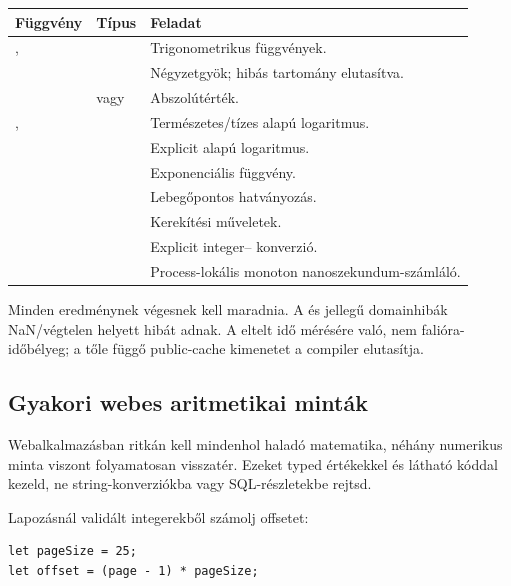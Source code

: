 \begin{center}
\begin{tabularx}{\textwidth}{@{}l l Y@{}}
\toprule
\textbf{Függvény} & \textbf{Típus} & \textbf{Feladat} \\
\midrule
{},  &  & Trigonometrikus függvények. \\
 &  & Négyzetgyök; hibás tartomány elutasítva. \\
 &  vagy  & Abszolútérték. \\
,  &  & Természetes/tízes alapú logaritmus. \\
 &  & Explicit alapú logaritmus. \\
 &  & Exponenciális függvény. \\
 &  & Lebegőpontos hatványozás. \\
 &  & Kerekítési műveletek. \\
 &  & Explicit integer-- konverzió. \\
 &  & Process-lokális monoton nanoszekundum-számláló. \\
\bottomrule
\end{tabularx}
\end{center}

Minden  eredménynek végesnek kell maradnia. A  és  jellegű domainhibák NaN/végtelen helyett hibát adnak. A  eltelt idő mérésére való, nem falióra-időbélyeg; a tőle függő public-cache kimenetet a compiler elutasítja.

\subsection*{Gyakori webes aritmetikai minták}

Webalkalmazásban ritkán kell mindenhol haladó matematika, néhány numerikus minta viszont folyamatosan visszatér. Ezeket typed értékekkel és látható kóddal kezeld, ne string-konverziókba vagy SQL-részletekbe rejtsd.

Lapozásnál validált integerekből számolj offsetet:

\begin{lstlisting}[language=Velran]
let pageSize = 25;
let offset = (page - 1) * pageSize;
\end{lstlisting}

